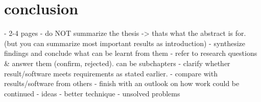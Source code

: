 \chapter{conclusion}

- 2-4 pages
- do NOT summarize the thesis -> thats what the abstract is for. (but you can summarize most important results as introduction)
- synthesize findings and conclude what can be learnt from them
- refer to research questions & answer them (confirm, rejected). can be subchapters
- clarify whether result/software meets requirements as stated earlier.
- compare with results/software from others
- finish with an outlook on how work could be continued
  - ideas
  - better technique
  - unsolved problems
